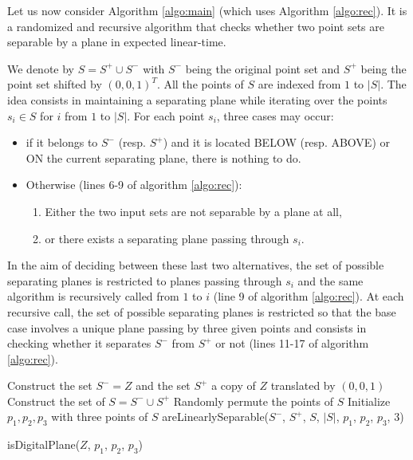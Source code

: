 \documentclass[a4paper, 11pt]{article}
\begin{document}
Let us now consider Algorithm \ref{algo:main} (which uses Algorithm \ref{algo:rec}). 
It is a randomized and recursive algorithm that checks whether two point sets
are separable by a plane in expected linear-time.


We denote by $S=S^+\cup S^-$ with $S^-$ being the original point set
and $S^+$ being the point set shifted by $(0,0,1)^T$. All the points of $S$ are indexed from $1$ to $|S|$.    
The idea consists in maintaining a separating plane while iterating over the points $s_i \in S$ 
for $i$ from $1$ to $|S|$. 
For each point $s_i$, three cases may occur:  
\begin{itemize}
 \item if it belongs to $S^-$ (resp. $S^+$) and it is located BELOW (resp. ABOVE) or ON 
the current separating plane, there is nothing to do. 
 \item Otherwise (lines 6-9 of algorithm \ref{algo:rec}): 
 \begin{enumerate}
   \item Either the two input sets are not separable by a plane at all,  
   \item or there exists a separating plane passing through $s_i$. 
 \end{enumerate}
\end{itemize}
In the aim of deciding between these last two alternatives, the set of
possible separating planes is restricted to planes passing through
$s_i$ and the same algorithm is recursively called from $1$ to $i$
(line 9 of algorithm \ref{algo:rec}).  At each recursive call, the set
of possible separating planes is restricted so that the base case
involves a unique plane passing by three given points and consists in
checking whether it separates $S^-$ from $S^+$ or not (lines 11-17 of
algorithm \ref{algo:rec}).


\begin{algorithm}[Hhtbp]
  Construct the set $S^- = Z$ and the set $S^+$ a copy of $Z$ translated by $(0,0,1)$ \; 
  Construct the set of $S = S^- \cup S^+$ \; 
  Randomly permute the points of $S$ \;
  Initialize $p_1, p_2, p_3$ with three points of $S$ 
  \Return areLinearlySeparable($S^-$, $S^+$, $S$, $|S|$, $p_1$, $p_2$, $p_3$, $3$) \; 
  \caption{isDigitalPlane($Z$, $p_1$, $p_2$, $p_3$)}
  \label{algo:main}
\end{algorithm}
\end{document}
